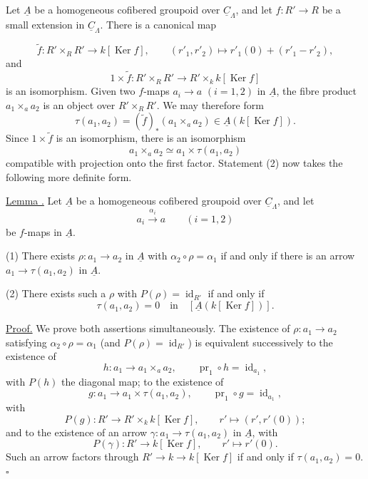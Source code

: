 Let $\underline A$ be a homogeneous cofibered groupoid over
$\underline C_\Lambda$, and let $f:R'\longrightarrow R$ be a small
extension in $\underline C_\Lambda$. There is a canonical map


\[
 \widetilde f:R'\times_RR'\longrightarrow k[\operatorname{Ker}f],
 \qquad
 (r'_1,r'_2)\longmapsto r'_1(0)+(r'_1-r'_2),
\]
and
\[
 1\times\widetilde f:R'\times_RR'
 \longrightarrow R'\times_k k[\operatorname{Ker}f]
\]
is an isomorphism. Given two $f$-maps
$a_i\longrightarrow a$ $(i=1,2)$ in $\underline A$, the fibre
product $a_1\times_a a_2$ is an object over $R'\times_RR'$. We may
therefore form
\[
 \tau(a_1,a_2)=
 (\widetilde f)_*(a_1\times_a a_2)
 \in\underline A(k[\operatorname{Ker}f]).
\]
Since $1\times\widetilde f$ is an isomorphism, there is an
isomorphism
\[
 a_1\times_a a_2\simeq a_1\times\tau(a_1,a_2)
\]
compatible with projection onto the first factor. Statement (2)
now takes the following more definite form.

\underline{Lemma .} Let $\underline A$ be a homogeneous
cofibered groupoid over $\underline C_\Lambda$, and let
\[
 a_i\xrightarrow{\ \alpha_i\ }a\qquad(i=1,2)
\]
be $f$-maps in $\underline A$.

(1) There exists $\rho:a_1\longrightarrow a_2$ in $\underline A$
with $\alpha_2\circ\rho=\alpha_1$ if and only if there is an arrow
$a_1\longrightarrow\tau(a_1,a_2)$ in $\underline A$.

(2) There exists such a $\rho$ with $P(\rho)=\operatorname{id}_{R'}$
if and only if
\[
 \tau(a_1,a_2)=0
 \quad\text{in}\quad
 [\underline A(k[\operatorname{Ker}f])].
\]

\underline{Proof.} We prove both assertions simultaneously. The
existence of $\rho:a_1\longrightarrow a_2$ satisfying
$\alpha_2\circ\rho=\alpha_1$ (and $P(\rho)=\operatorname{id}_{R'}$)
is equivalent successively to the existence of
\[
 h:a_1\longrightarrow a_1\times_a a_2,
 \qquad \operatorname{pr}_1\circ h=\operatorname{id}_{a_1},
\]
with $P(h)$ the diagonal map; to the existence of
\[
 g:a_1\longrightarrow a_1\times\tau(a_1,a_2),
 \qquad \operatorname{pr}_1\circ g=\operatorname{id}_{a_1},
\]
with
\[
 P(g):R'\longrightarrow R'\times_k k[\operatorname{Ker}f],
 \qquad r'\longmapsto(r',r'(0));
\]
and to the existence of an arrow
$\gamma:a_1\longrightarrow\tau(a_1,a_2)$ in $\underline A$, with
\[
 P(\gamma):R'\longrightarrow k[\operatorname{Ker}f],
 \qquad r'\longmapsto r'(0).
\]
Such an arrow factors through
$R'\longrightarrow k\longrightarrow k[\operatorname{Ker}f]$ if and
only if $\tau(a_1,a_2)=0$. \hfill$\square$

